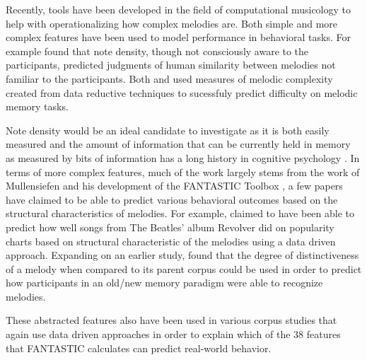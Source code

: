 \documentclass[]{book}
\begin{document}
Recently, tools have been developed in the field of computational musicology to help with operationalizing how
complex melodies are.
Both simple and more complex features have been used to model performance in behavioral tasks.
For example \citet{eerolaPerceivedComplexityWestern2006} found that note density, though not consciously aware to the participants, predicted judgments of human similarity between melodies not familiar to the participants.
Both \citet{harrisonModellingMelodicDiscrimination2016} and \citet{bakerPerceptionLeitmotivesRichard2017} used measures of melodic complexity created from data reductive techniques to sucessfuly predict difficulty on melodic memory tasks.

Note density would be an ideal candidate to investigate as it is both easily measured and the amount of
information that can be currently held in memory as measured by bits of information has a long history in cognitive psychology \citep{cowanWorkingMemoryCapacity2005, millerInformationMemory1956, pearceStatisticalLearningProbabilistic2018a}.
In terms of more complex features, much of the work largely stems from the work of Mullensiefen and his development of the FANTASTIC Toolbox \citeyearpar{mullensiefenFantasticFeatureANalysis2009}, a few papers have claimed to be able to predict various behavioral outcomes based on the structural characteristics of melodies.
For example, \citep{kopiezAufSucheNach2011} claimed to have been able to predict how well songs from The Beatles' album Revolver did on popularity charts based on structural characteristic of the melodies using a data driven approach.
Expanding on an earlier study, \citep{mullensiefenRoleFeaturesContext2014} found that the degree of distinctiveness of a melody when compared to its parent corpus could be used in order to predict how participants in an old/new memory paradigm were able to recognize melodies.

These abstracted features also have been used in various corpus studies \citep{jakubowskiDissectingEarwormMelodic2017, janssenPredictingVariationFolk2017, rainsfordDistinctivenessEffectRecognition2019, rainsfordMUSOSMUsicSOftware2018}
that again use data driven approaches in order to explain which of the 38 features that FANTASTIC calculates can predict real-world behavior.
\end{document}
